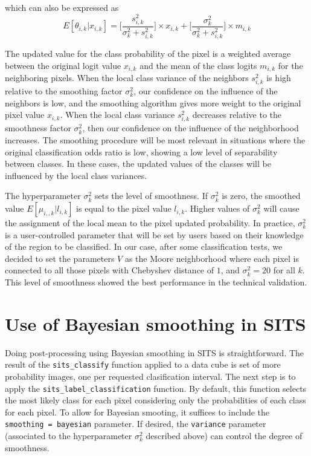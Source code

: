 \documentclass[a4paper,]{tufte-book}
\begin{document}
which can also be expressed as
\[
    {E}[\theta_{i,k} | x_{i,k}] =
\Biggl [ \frac{s^2_{i,k}}{\sigma^2_{k} +s^2_{i,k}} \Biggr ] \times
x_{i,k} +
\Biggl [ \frac{\sigma^2_{k}}{\sigma^2_{k} +s^2_{i,k}} \Biggr ] \times m_{i,k}
\]

The updated value for the class probability of the pixel is a weighted average between the original logit value \(x_{i,k}\) and the mean of the class logits \(m_{i,k}\) for the neighboring pixels. When the local class variance of the neighbors \(s^2_{i,k}\) is high relative to the smoothing factor \(\sigma^2_k\), our confidence on the influence of the neighbors is low, and the smoothing algorithm gives more weight to the original pixel value \(x_{i,k}\). When the local class variance \(s^2_{i,k}\) decreases relative to the smoothness factor \(\sigma^2_k\), then our confidence on the influence of the neighborhood increases. The smoothing procedure will be most relevant in situations where the original classification odds ratio is low, showing a low level of separability between classes. In these cases, the updated values of the classes will be influenced by the local class variances.

The hyperparameter \(\sigma^2_k\) sets the level of smoothness. If \(\sigma^2_k\) is zero, the smoothed value \({E}[\mu_{i,,k} | l_{i,k}]\) is equal to the pixel value \(l_{i,k}\). Higher values of \(\sigma^2_k\) will cause the assignment of the local mean to the pixel updated probability. In practice, \(\sigma^2_k\) is a user-controlled parameter that will be set by users based on their knowledge of the region to be classified. In our case, after some classification tests, we decided to set the parameters \(V\) as the Moore neighborhood where each pixel is connected to all those pixels with Chebyshev distance of \(1\), and \(\sigma^2_k=20\) for all \(k\). This level of smoothness showed the best performance in the technical validation.

\hypertarget{use-of-bayesian-smoothing-in-sits}{%
\section{Use of Bayesian smoothing in SITS}\label{use-of-bayesian-smoothing-in-sits}}

Doing post-processing using Bayesian smoothing in SITS is straightforward. The result of the \texttt{sits\_classify} function applied to a data cube is set of more probability images, one per requested clasification interval. The next step is to apply the \texttt{sits\_label\_classification} function. By default, this function selects the most likely class for each pixel considering only the probabilities of each class for each pixel. To allow for Bayesian smooting, it suffices to include the \texttt{smoothing\ =\ bayesian} parameter. If desired, the \texttt{variance} parameter (associated to the hyperparameter \(\sigma^2_k\) described above) can control the degree of smoothness.
\end{document}

